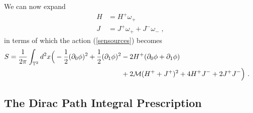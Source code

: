 \documentclass[11pt]{article}
\numberwithin{equation}{section}
\begin{document}
We can now  expand
\begin{align}
H &= H^+ \omega_+ \nonumber \\
 J &= J^{+} \omega_{+}+J^{-} \omega_{-} \;,
\end{align}
in terms of which the action (\ref{sensources}) becomes
\begin{align}
S =\frac{1}{2\pi} \int_{\mathbb T^2} d^2x\Big(-\frac{1}{2} (\partial_0 \phi)^2 + \frac{1}{2} (\partial_1 \phi)^2 &- 2 H^+ ( \partial_0 \phi + \partial_1 \phi) \cr
& + 2 {\mathcal M} (H^+ + J^{+})^2  + 4H^{+} J^{-} + 2 J^{+}J^{-} \Big)\ .
\label{eq:Sfull}
\end{align}

\subsection{The Dirac Path Integral Prescription}\label{sec:dirac}
\end{document}
